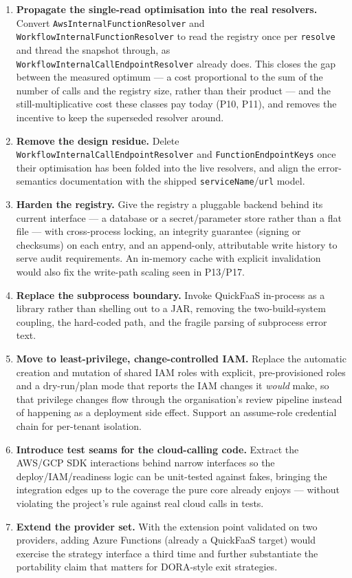 \begin{enumerate}
    \item \textbf{Propagate the single-read optimisation into the real resolvers.} Convert
    \texttt{AwsInternalFunctionResolver} and \texttt{WorkflowInternalFunctionResolver} to read
    the registry once per \texttt{resolve} and thread the snapshot through, as
    \texttt{WorkflowInternalCallEndpointResolver} already does. This closes the gap between the
    measured optimum --- a cost proportional to the sum of the number of calls and the registry
    size, rather than their product --- and the still-multiplicative cost these classes pay today
    (P10, P11), and removes the incentive to keep the superseded resolver around.
    \item \textbf{Remove the design residue.} Delete
    \texttt{WorkflowInternalCallEndpointResolver} and \texttt{FunctionEndpointKeys} once their
    optimisation has been folded into the live resolvers, and align the error-semantics
    documentation with the shipped \texttt{serviceName}/\texttt{url} model.
    \item \textbf{Harden the registry.} Give the registry a pluggable backend behind its current
    interface --- a database or a secret/parameter store rather than a flat file --- with
    cross-process locking, an integrity guarantee (signing or checksums) on each entry, and an
    append-only, attributable write history to serve audit requirements. An in-memory cache with
    explicit invalidation would also fix the write-path scaling seen in P13/P17.
    \item \textbf{Replace the subprocess boundary.} Invoke QuickFaaS in-process as a library
    rather than shelling out to a JAR, removing the two-build-system coupling, the hard-coded
    path, and the fragile parsing of subprocess error text.
    \item \textbf{Move to least-privilege, change-controlled IAM.} Replace the automatic
    creation and mutation of shared IAM roles with explicit, pre-provisioned roles and a
    dry-run/plan mode that reports the IAM changes it \emph{would} make, so that privilege
    changes flow through the organisation's review pipeline instead of happening as a deployment
    side effect. Support an assume-role credential chain for per-tenant isolation.
    \item \textbf{Introduce test seams for the cloud-calling code.} Extract the AWS/GCP SDK
    interactions behind narrow interfaces so the deploy/IAM/readiness logic can be unit-tested
    against fakes, bringing the integration edges up to the coverage the pure core already
    enjoys --- without violating the project's rule against real cloud calls in tests.
    \item \textbf{Extend the provider set.} With the extension point validated on two providers,
    adding Azure Functions (already a QuickFaaS target) would exercise the strategy interface a
    third time and further substantiate the portability claim that matters for DORA-style exit
    strategies.
\end{enumerate}

